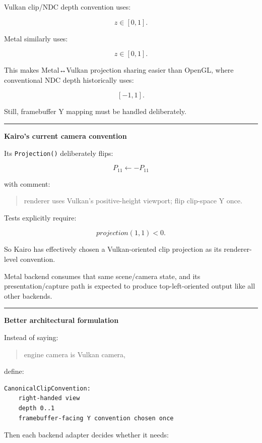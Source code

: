 Vulkan clip/NDC depth convention uses:

\[
z\in[0,1].
\]

Metal similarly uses:

\[
z\in[0,1].
\]

This makes Metal↔Vulkan projection sharing easier than OpenGL, where conventional NDC depth historically uses:

\[
[-1,1].
\]

Still, framebuffer Y mapping must be handled deliberately.

\begin{center}\rule{0.5\linewidth}{0.5pt}\end{center}

\textbf{Kairo's current camera convention}

Its \texttt{Projection()} deliberately flips:

\[
P_{11}
\leftarrow
-P_{11}
\]

with comment:

\begin{quote}
renderer uses Vulkan's positive-height viewport; flip clip-space Y once.
\end{quote}

Tests explicitly require:

\[
projection(1,1)<0.
\]

So Kairo has effectively chosen a Vulkan-oriented clip projection as its renderer-level convention.

Metal backend consumes that same scene/camera state, and its presentation/capture path is expected to produce top-left-oriented output like all other backends.

\begin{center}\rule{0.5\linewidth}{0.5pt}\end{center}

\textbf{Better architectural formulation}

Instead of saying:

\begin{quote}
engine camera is Vulkan camera,
\end{quote}

define:

\begin{verbatim}
CanonicalClipConvention:
    right-handed view
    depth 0..1
    framebuffer-facing Y convention chosen once
\end{verbatim}

Then each backend adapter decides whether it needs:

